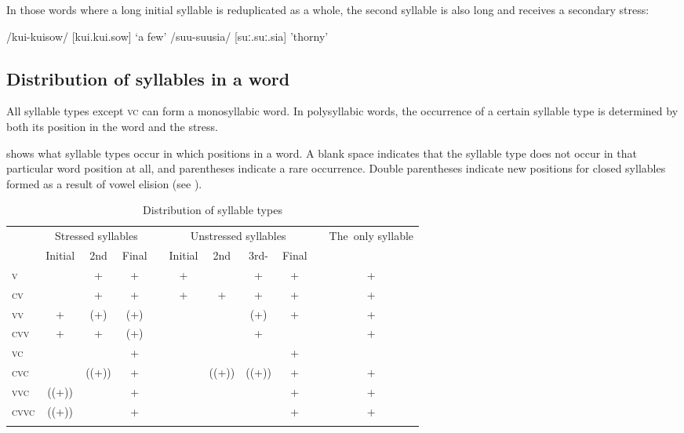 In those words where a long initial syllable is reduplicated as a whole, the second syllable is also long and receives a secondary stress:

\ea
\ea
/kui-kuisow/  [{{\textprimstress}}kui.{{\textprimstress}}{{\textprimstress}}kui.sow]  `a few'
\ex
/suu-suusia/  [{{\textprimstress}}suː.{{\textprimstress}}{{\textprimstress}}suː.sia]  'thorny'
\z
\z

\subsection{Distribution of syllables in a word}\label{sec:2.3.2}

All syllable types except  \textsc{vc} can form a monosyllabic word. In polysyllabic words, the occurrence of a certain syllable type is determined by both its position in the word and the stress. 

 shows what syllable types occur in which positions in a word.  A blank space indicates that the syllable type does not occur in that particular word position at all, and parentheses indicate a rare occurrence. Double parentheses indicate new positions for closed syllables formed as a result of vowel elision (see ). 



\begin{table}
\caption{Distribution of syllable types}
\label{tab:7:syllabletypes}
  \begin{tabular}{lcccccccccc}
  \mytoprule
  \multirow{2}{*}{\parbox{1cm}{Syllable\\type}} & \multicolumn{3}{c}{Stressed syllables} &  & \multicolumn{4}{c}{Unstressed syllables}  &  & \multirow{2}{*}{\parbox{1.2cm}{\mbox{The only} \mbox{syllable}}}\\
  & Initial & 2nd{\footnotemark} & Final &  & Initial & 2nd & 3rd- & Final &  & \\
  \midrule
  \textsc{v} &  & + & + &  & + &  & + & + &  & +\\
  \textsc{cv} &  & + & + &  & + & + & + & + &  & +\\
  \textsc{vv} & + & (+) & (+) &  &  &  & (+) & + &  & +\\
  \textsc{cvv} & + & + & (+) &  &  &  & + &  &  & +\\
  \textsc{vc} &  &  & + &  &  &  &  & + &  & \\
  \textsc{cvc} &  & ((+)) & + &  &  & ((+)) & ((+)) & + &  & +\\
  \textsc{vvc} & ((+)) &  & + &  &  &  &  & + &  & +\\
  \textsc{cvvc} & ((+)) &  & + &  &  &  &  & + &  & +\\
  \mybottomrule
  \end{tabular}
\end{table}

